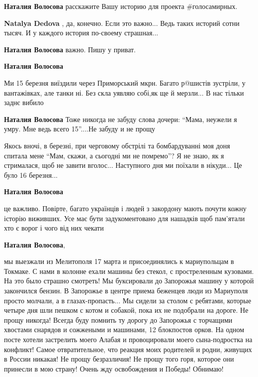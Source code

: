 \begin{itemize} %
\textbf{Наталия Волосова} расскажите Вашу историю для проекта \#голосамирных.

\textbf{Natalya Dedova} , да, конечно. Если это важно... Ведь таких историй сотни тысяч. И у каждого история по-своему страшная...

\textbf{Наталия Волосова} важно. Пишу у приват.

\textbf{Наталия Волосова} 

Ми 15 березня виїздили через Приморський мкрн. Багато р@шистів зустріли, у
вантажівках, але танки ні. Без скла уявляю собі,як ще й мерзли... В нас тільки
заднє вибило

\textbf{Наталия Волосова} Тоже никогда не забуду слова дочери: \enquote{Мама, неужели я умру. Мне ведь всего 15}....Не забуду и не прощу


Якось вночі, в березні, при черговому обстрілі та бомбардуванні моя доня
спитала мене \enquote{Мам, скажи, а сьогодні ми не помремо}? Я не знаю, як я
стрималася, щоб не завити вголос... Наступного дня ми поїхали в нікуди... Це
було 16 березня...

\textbf{Наталия Волосова} 

це важливо. Повірте, багато українців і людей з закордону мають почути кожну
історію виживших. Усе має бути задукоментовано для нашадків щоб пам'ятали хто є
ворог і чого від них чекати

\textbf{Наталия Волосова},

мы выезжали из Мелитополя 17 марта и присоединялись к мариупольцам в Токмаке. С
нами в колонне ехали машины без стекол, с простреленным кузовами. На это было
страшно смотреть! Мы буксировали до Запорожья машину у которой закончился
бензин. В Запорожье в центре приема беженцев люди из Мариуполя просто молчали, а
в глазах-пропасть... Мы сидели за столом с ребятами, которые четыре дня шли
пешком с котом и собакой, пока их не подобрали на дороге. Не прощу никогда! Всегда
буду помнить ту дорогу до Запорожья с торчащими хвостами снарядов и сожжеными и
машинами, 12 блокпостов орков. На одном посте хотели застрелить моего Алабая и
провоцировали моего сына-подростка на конфликт! Самое отвратительное, что реакция
моих родителей и родни, живущих в России никакая! Не прощу безразличия! Не прощу
того горя, которое они принесли в мою страну! Очень жду освобождения и Победы!
Обнимаю!


\end{itemize}
